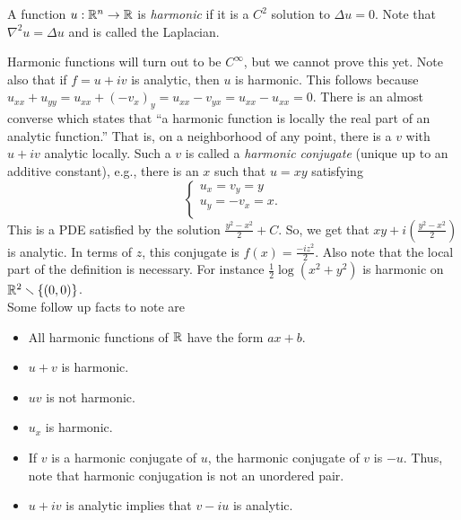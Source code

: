 \documentclass[11pt,leqno,oneside]{amsart}
\begin{document}
    \begin{defn}
        A function $u: {\mathbb R}^n \to {\mathbb R}$ is \emph{harmonic} if it is a $C^2$
        solution to $\Delta u = 0$. Note that $\nabla^2u = \Delta u$ and is
        called the Laplacian.
    \end{defn}
    Harmonic functions will turn out to be $C^\infty$, but we cannot prove this
    yet. Note also that if $f = u+iv$ is analytic, then $u$ is harmonic. This
    follows because $u_{xx}+u_{yy} = u_{xx}+(-v_x)_y = u_{xx}-v_{yx} =
    u_{xx}-u_{xx} = 0$. There is an almost converse which states that ``a
    harmonic function is locally the real part of an analytic function.'' That
    is, on a neighborhood of any point, there is a $v$ with $u+iv$ analytic locally.
    Such a $v$ is called a \emph{harmonic conjugate} (unique up to an additive
    constant), e.g., there is an $x$ such that $u=xy$ satisfying \[
        \begin{cases}
 u_x = v_y = y \\
 u_y = -v_x = x. \\
    \end{cases}
\]
This is a PDE satisfied by the solution $\frac{y^2-x^2}{2} + C$. So, we get
that $xy+i\left( \frac{y^2-x^2}{2} \right)$ is analytic. In terms of $z$, this
conjugate is $f(x) = \frac{-iz^2}{2}$. Also note that the local part of the
definition is necessary. For instance $\frac{1}{2} \log(x^2+y^2)$ is harmonic
on ${\mathbb R}^2 \smallsetminus \{(0,0)\}$. \\

Some follow up facts to note are
\begin{itemize}
    \item All harmonic functions of ${\mathbb R}$ have the form $ax+b$.
    \item $u+v$ is harmonic.
    \item $uv$ is not harmonic.
    \item $u_x$ is harmonic.
    \item If $v$ is a harmonic conjugate of $u$, the harmonic conjugate of $v$
       is $-u$. Thus, note that harmonic conjugation is not an unordered pair.
    \item $u+iv$ is analytic implies that $v-iu$ is analytic.
\end{itemize}
\end{document}
